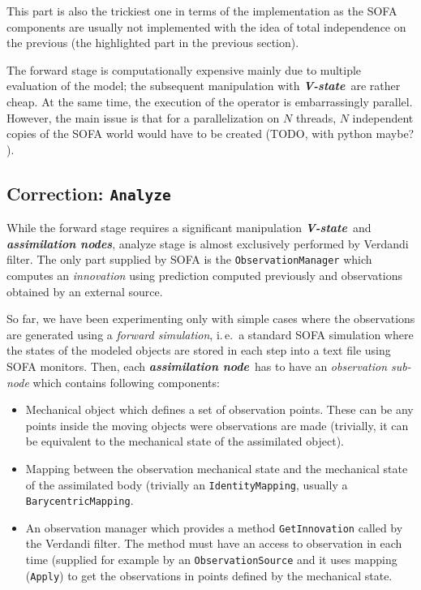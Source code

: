 \documentclass[10pt]{article}
\def\ie{i.\,e.}
\def\asn{\textit{\textbf{assimilation node}}}
\def\asns{\textit{\textbf{assimilation nodes}}}
\def\vstate{\textit{\textbf{V-state}}}
\begin{document}
This part is also the trickiest one in terms of the implementation as the SOFA components are usually not implemented with the idea of total independence on the previous 
(the highlighted part in the previous section).

The forward stage is computationally  expensive mainly due to multiple evaluation of the model; the subsequent manipulation with \vstate\ are rather cheap. 
At the same time, the execution of the operator is embarrassingly parallel. However, the main issue is that for a parallelization on $N$ threads, $N$ independent copies of the 
SOFA world would have to be created (TODO, with python maybe? ).


\subsection{Correction: \texttt{Analyze}}
While the forward stage requires a significant manipulation \vstate\ and \asns, analyze stage is almost exclusively performed by Verdandi filter. The only 
part supplied by SOFA is the \texttt{ObservationManager} which computes an \emph{innovation} using prediction computed previously and observations obtained by an external source. 

So far, we have been experimenting only with simple cases where the observations are generated using a \emph{forward simulation}, \ie\ a standard SOFA simulation where 
the states of the modeled objects are stored in each step into a text file using SOFA monitors. Then, each \asn\ has to have an \emph{observation sub-node} which 
contains following components:
\begin{itemize}
\item Mechanical object which defines a set of observation points. These can be any points inside the moving objects were observations are made (trivially, it can be equivalent to the mechanical 
state of the assimilated object).
\item Mapping between the observation mechanical state and the mechanical state of the assimilated body (trivially an \texttt{IdentityMapping}, usually a \texttt{BarycentricMapping}.
\item An observation manager which provides a method \texttt{GetInnovation} called by the Verdandi filter. The method must have an access to observation in each time (supplied for example by an \texttt{ObservationSource} and it uses mapping (\texttt{Apply}) to get the observations in points defined by the mechanical state. 
\end{itemize}
\end{document}
